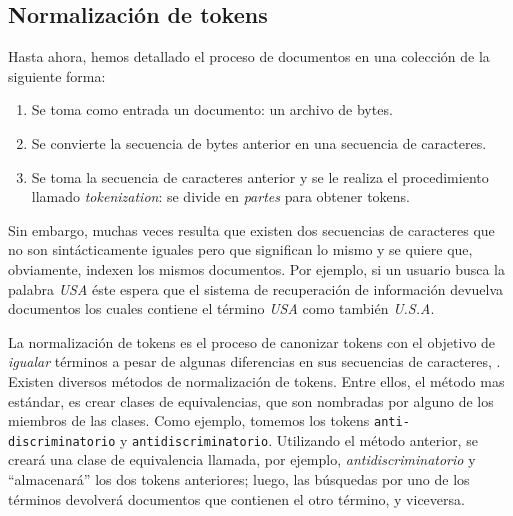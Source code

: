 	\subsection{Normalización de tokens}
		Hasta ahora, hemos detallado el proceso de documentos en una colección de la siguiente forma:
		\begin{enumerate}
			\item Se toma como entrada un documento: un archivo de bytes.
			\item Se convierte la secuencia de bytes anterior en una secuencia de caracteres.
			\item Se toma la secuencia de caracteres anterior y se le realiza el procedimiento llamado \textit{tokenization}: se divide en \textit{partes} para obtener tokens.
		\end{enumerate}
		Sin embargo, muchas veces resulta que existen dos secuencias de caracteres que no son sintácticamente iguales pero que significan lo mismo y se quiere que, obviamente, indexen los mismos documentos. Por ejemplo, si un usuario busca la palabra \textit{USA} éste espera que el sistema de recuperación de información devuelva documentos los cuales contiene el término \textit{USA} como también \textit{U.S.A}. \par
		
		La normalización de tokens es el proceso de canonizar tokens con el objetivo de \textit{igualar} términos a pesar de algunas diferencias en sus secuencias de caracteres, \cite{manning2009}. Existen diversos métodos de normalización de tokens. Entre ellos, el método  mas estándar, es crear clases de equivalencias, que son nombradas por alguno de los miembros de las clases. Como ejemplo, tomemos los tokens \texttt{anti-discriminatorio} y \texttt{antidiscriminatorio}. Utilizando el método anterior, se creará una clase de equivalencia llamada, por ejemplo, \textit{antidiscriminatorio} y \enquote{almacenará} los dos tokens anteriores; luego, las búsquedas por uno de los términos devolverá documentos que contienen el otro término, y viceversa. \par
		
